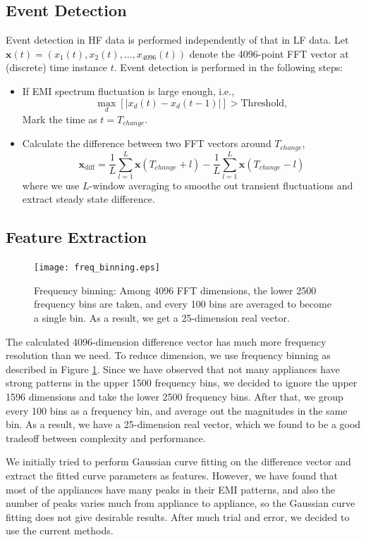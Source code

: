 \documentclass[11pt, letterpaper]{article}
\begin{document}
\subsection{Event Detection}
Event detection in HF data is performed independently of that in LF data. Let $\mathbf{x}(t)=(x_1(t),x_2(t),...,x_{4096}(t))$ denote the 4096-point FFT vector at (discrete) time instance $t$. Event detection is performed in the following steps:
\begin{itemize}
\item If EMI spectrum fluctuation is large enough, i.e.,
\[\max_{d}[|x_d(t)-x_d(t-1)|]>\mbox{Threshold},\]
Mark the time as $t=T_{change}$.
\item Calculate the difference between two FFT vectors around $T_{change}$,
\[\mathbf{x}_{\mbox{diff}}=\frac{1}{L}\sum_{l=1}^L \mathbf{x}(T_{change}+l)-\frac{1}{L}\sum_{l=1}^L \mathbf{x}(T_{change}-l)\]
where we use $L$-window averaging to smoothe out transient fluctuations and extract steady state difference.
\end{itemize}

\subsection{Feature Extraction}
\begin{figure}
\begin{center}
\texttt{[image: freq\_binning.eps]}
  \caption{Frequency binning: Among 4096 FFT dimensions, the lower 2500 frequency bins are taken, and every 100 bins are averaged to become a single bin. As a result, we get a 25-dimension real vector.}
  \label{fig:freq_binning}
\end{center}
\end{figure}

The calculated 4096-dimension difference vector has much more frequency resolution than we need. To reduce dimension, we use frequency binning as described in Figure \ref{fig:freq_binning}. Since we have observed that not many appliances have strong patterns in the upper 1500 frequency bins, we decided to ignore the upper 1596 dimensions and take the lower 2500 frequency bins. After that, we group every 100 bins as a frequency bin, and average out the magnitudes in the same bin. As a result, we have a 25-dimension real vector, which we found to be a good tradeoff between complexity and performance.

We initially tried to perform Gaussian curve fitting on the difference vector and extract the fitted curve parameters as features. However, we have found that most of the appliances have many peaks in their EMI patterns, and also the number of peaks varies much from appliance to appliance, so the Gaussian curve fitting does not give desirable results. After much trial and error, we decided to use the current methods.
\end{document}
